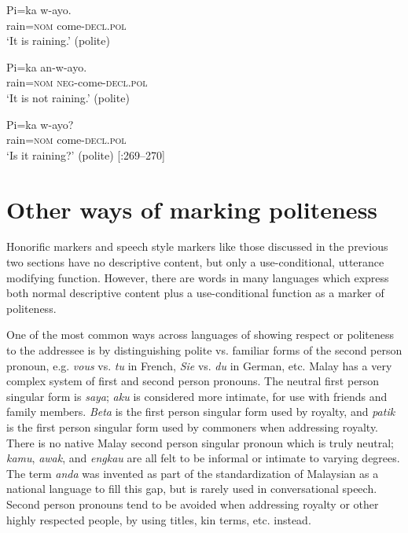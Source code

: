 \ea \ea \gll Pi=ka  w-ayo.\\
rain=\textsc{nom}  come-\textsc{decl.pol}\\
\glt ‘It is raining.’ (polite)

\ex \gll Pi=ka  an-w-ayo.\\
rain=\textsc{nom}  \textsc{neg}-come-\textsc{decl.pol}\\
\glt ‘It is not raining.’ (polite)

\ex \gll  Pi=ka  w-ayo?\\
rain=\textsc{nom}  come-\textsc{decl.pol}\\
\glt ‘Is it raining?’ (polite)  [\citealt{Sohn1999}:269–270]
\z
\z

\section{Other ways of marking politeness}\label{sec:} %

Honorific markers and speech style markers like those discussed in the previous two sections have no descriptive content, but only a use-conditional, utterance modifying function. However, there are words in many languages which express both normal descriptive content plus a use-conditional function as a marker of politeness.



One of the most common ways across languages of showing respect or politeness to the addressee is by distinguishing polite vs. familiar forms of the second person pronoun, e.g. \textit{vous} vs. \textit{tu} in French, \textit{Sie} vs. \textit{du} in German, etc. Malay has a very complex system of first and second person pronouns. The neutral first person singular form is \textit{saya}; \textit{aku} is considered more intimate, for use with friends and family members. \textit{Beta} is the first person singular form used by royalty, and \textit{patik} is the first person singular form used by commoners when addressing royalty. There is no native Malay second person singular pronoun which is truly neutral; \textit{kamu}, \textit{awak}, and \textit{engkau} are all felt to be informal or intimate to varying degrees. The term \textit{anda} was invented as part of the standardization of Malaysian as a national language to fill this gap, but is rarely used in conversational speech. Second person pronouns tend to be avoided when addressing royalty or other highly respected people, by using titles, kin terms, etc. instead.



